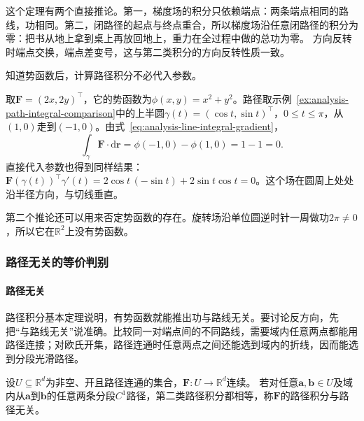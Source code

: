 这个定理有两个直接推论。第一，梯度场的积分只依赖端点：两条端点相同的路线，功相同。第二，闭路径的起点与终点重合，所以梯度场沿任意闭路径的积分为零：把书从地上拿到桌上再放回地上，重力在全过程中做的总功为零。
方向反转时端点交换，端点差变号，这与第二类积分的方向反转性质一致。

知道势函数后，计算路径积分不必代入参数。
\begin{example}[用势函数计算沿半圆的积分]
取$\bm F=(2x,2y)^\top$，它的势函数为$\phi(x,y)=x^2+y^2$。路径取示例~\ref{ex:analysis-path-integral-comparison}中的上半圆$\gamma(t)=(\cos t,\sin t)^\top$，$0\leq t\leq\pi$，从$(1,0)$走到$(-1,0)$。由式~\eqref{eq:analysis-line-integral-gradient}，
\[
 \int_\gamma\bm F\cdot\mathrm d\bm r=\phi(-1,0)-\phi(1,0)=1-1=0.
\]
直接代入参数也得到同样结果：$\bm F(\gamma(t))^\top\gamma'(t)=2\cos t\,(-\sin t)+2\sin t\cos t=0$。这个场在圆周上处处沿半径方向，与切线垂直。
\end{example}

第二个推论还可以用来否定势函数的存在。旋转场沿单位圆逆时针一周做功$2\pi\neq0$，所以它在$\mathbb R^2$上没有势函数。

\subsubsection{路径无关的等价判别}

\paragraph{路径无关}

路径积分基本定理说明，有势函数就能推出功与路线无关。要讨论反方向，先把“与路线无关”说准确。比较同一对端点间的不同路线，需要域内任意两点都能用路径连接；对欧氏开集，路径连通时任意两点之间还能选到域内的折线，因而能选到分段光滑路径。
\begin{definition}[路径无关]
设$U\subseteq\mathbb R^d$为非空、开且路径连通的集合，$\bm F:U\to\mathbb R^d$连续。
若对任意$\bm a,\bm b\in U$及域内从$\bm a$到$\bm b$的任意两条分段$C^1$路径，第二类路径积分都相等，称$\bm F$的路径积分与路径无关。
\end{definition}

